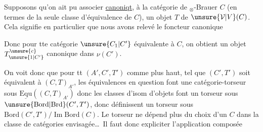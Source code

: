 
Supposons qu'on ait pu associer \uline{canoniqt},
à la catégorie de $_\otimes$-Brauer $C$ (en termes de
la seule classe d'équivalence de $C$), un objet
$T$ de $\unsure{\mathcal V|V}(C)$. Cela signifie en particulier que
nous avons relevé le foncteur canonique 


Donc pour tte catégorie $\unsure{C_1|C'}$ équivalente à $C$,
on obtient un objet $T_{\unsure{1|C'}}^{\unsure{c}}$ canonique dans $\nu(C')$.

On voit donc que pour tt $(A',C',T')$ comme
plus haut,  tel que $(C',T')$ soit
équivalent à $(C,T)_{A'}$, les équivalences
en question font une catégorie-torseur sous
$\underline{\mathrm{Equ}}((C,T)_{A'})$  donc 
les classes d'isom d'objets font
un torseur sous 
$\unsure{\mathrm{Bord}|\mathrm{Brd}}(C',T')$, donc définissent un torseur sous
$\mathrm{Bord}(C',T')/\operatorname{Im}\mathrm{Bord}(C)$. Le torseur ne dépend
plus du choix d'un $C$ dans la classe
de catégories envisagée\ldots\ Il faut donc expliciter
l'application composée

